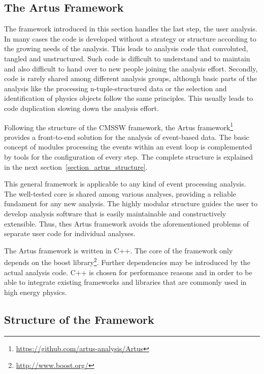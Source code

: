 \documentclass[a4paper, oneside, 10pt]{scrartcl}
\begin{document}
\subsection{The Artus Framework \label{section_artus_motivation}}

The framework introduced in this section handles the last step, the user analysis. In many cases the code is developed without a strategy or structure according to the growing needs of the analysis. This leads to analysis code that convoluted, tangled and unstructured. Such code is difficult to understand and to maintain and also difficult to hand over to new people joining the analysis effort. Secondly, code is rarely shared among different analysis groups, although basic parts of the analysis like the processing n-tuple-structured data or the selection and identification of physics objects follow the same principles. This usually leads to code duplication slowing down the analysis effort.

Following the structure of the CMSSW framework, the Artus framework\footnote{\url{https://github.com/artus-analysis/Artus}} provides a front-to-end solution for the analysis of event-based data. The basic concept of modules processing the events within an event loop is complemented by tools for the configuration of every step. The complete structure is explained in the next section~\ref{section_artus_structure}.

This general framework is applicable to any kind of event processing analysis. The well-tested core is shared among various analyses, providing a reliable fundament for any new analysis. The highly modular structure guides the user to develop analysis software that is easily maintainable and constructively extensible. Thus, thes Artus framework avoids the aforementioned problems of separate user code for individual analyses.

The Artus framework is written in C++. The core of the framework only depends on the boost library\footnote{\url{http://www.boost.org/}}. Further dependencies may be introduced by the actual analysis code. C++ is chosen for performance reasons and in order to be able to integrate existing frameworks and libraries that are commonly used in high energy physics.


\subsection{Structure of the Framework \label{section_artus_structure}}
\end{document}
